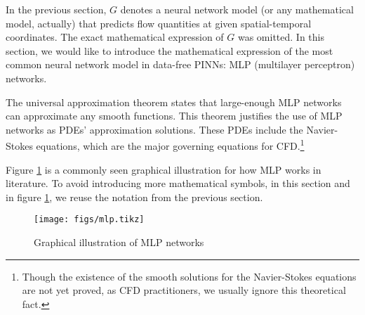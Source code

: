 
In the previous section, $G$ denotes a neural network model (or any mathematical model, actually) that predicts flow quantities at given spatial-temporal coordinates.
The exact mathematical expression of $G$ was omitted.
In this section, we would like to introduce the mathematical expression of the most common neural network model in data-free PINNs: MLP (multilayer perceptron) networks.

The universal approximation theorem \cite{hornik_approximation_1991} states that large-enough MLP networks can approximate any smooth functions.
This theorem justifies the use of MLP networks as PDEs' approximation solutions.
These PDEs include the Navier-Stokes equations, which are the major governing equations for CFD.\footnote[0]{Though the existence of the smooth solutions for the Navier-Stokes equations are not yet proved, as CFD practitioners, we usually ignore this theoretical fact.}

Figure \ref{fig:mlp-graph} is a commonly seen graphical illustration for how MLP works in literature.
To avoid introducing more mathematical symbols, in this section and in figure \ref{fig:mlp-graph}, we reuse the notation from the previous section.

\begin{figure}
    \singlespacing
    \texttt{[image: figs/mlp.tikz]}
    \caption{Graphical illustration of MLP networks}
    \label{fig:mlp-graph}
\end{figure}

